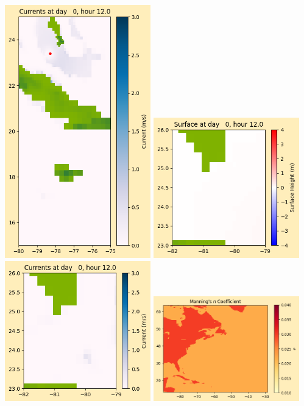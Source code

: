 \documentclass[11pt]{article}
\begin{document}
\includegraphics[width=0.475\textwidth]{frame0014fig1008.png}
\vskip 10pt 
\includegraphics[width=0.475\textwidth]{frame0014fig1009.png}
\includegraphics[width=0.475\textwidth]{frame0014fig1010.png}
\vskip 10pt 
\includegraphics[width=0.475\textwidth]{frame0014fig1011.png}
\end{document}
